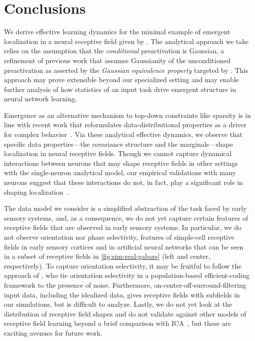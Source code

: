 \section{Conclusions}
\label{sec:conclusions}

We derive effective learning dynamics for the minimal example of emergent localization in a neural receptive field given by \textcite{ingrosso2022data}. 
The analytical approach we take relies on the assumption that the \emph{conditional} preactivation is Gaussian, a refinement of previous work that assumes Gaussianity of the unconditioned preactivation as asserted by the \emph{Gaussian equivalence property} targeted by \textcite{ingrosso2022data}.
This approach may prove extensible beyond our specialized setting and may enable further analysis of how statistics of an input task drive emergent structure in neural network learning.

Emergence as an alternative mechanism to top-down constraints like sparsity
is in line with recent work that reformulates data-distributional properties as a driver for complex behavior~\parencite{chan2022data}. 
Via these analytical effective dynamics, we observe that specific data properties---the covariance structure 
and the marginals---shape localization in neural receptive fields.
Though we cannot capture dynamical interactions between neurons that may shape receptive fields in other settings with the single-neuron analytical model, our empirical validations with many neurons suggest that these interactions do not, in fact, play a significant role in shaping localization~\cite[\cf][]{harsh2020placecell}.

The data model we consider is a simplified abstraction of the task faced by early sensory systems, and, as a consequence, we do not yet capture certain features of receptive fields that are observed in early sensory systems.
In particular, we do not observe orientation nor phase selectivity, features of simple-cell receptive fields in early sensory cortices and in artificial neural networks that can be seen in a subset of receptive fields in \cref{fig:sim-real-gabors} (left and center, respectively).
To capture orientation selectivity, it may be fruitful to follow the approach of \textcite{karklin2011efficient}, who tie orientation selectivity in a population-based efficient-coding framework to the presence of noise.
Furthermore, on-center-off-surround-filtering input data, including the idealized data, gives receptive fields with subfields in our simulations, but is difficult to analyze.
Lastly, we do not yet look at the distribution of receptive field shapes and do not validate against other models of receptive field learning beyond a brief comparison with ICA~\parencite[\cf][]{saxe2011unsupervised}, but these are exciting avenues for future work.
